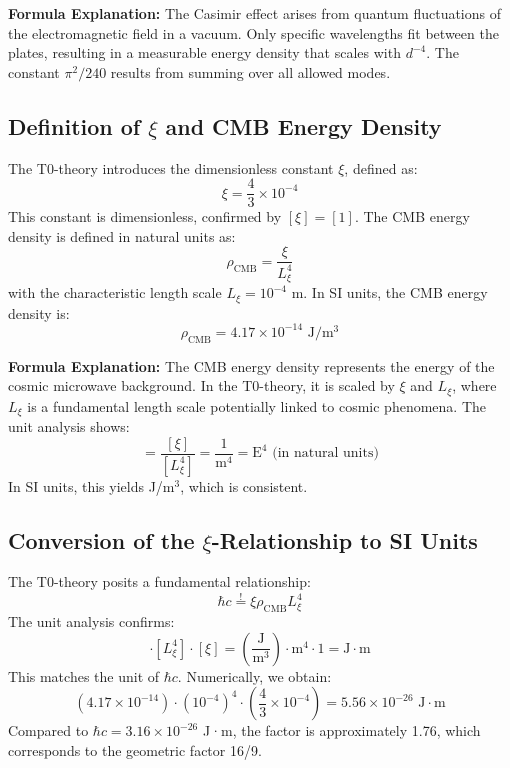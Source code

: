 \documentclass[12pt,a4paper]{article}
\theoremstyle{definition}
\theoremstyle{remark}
\begin{document}
	\textbf{Formula Explanation:} The Casimir effect arises from quantum fluctuations of the electromagnetic field in a vacuum. Only specific wavelengths fit between the plates, resulting in a measurable energy density that scales with $d^{-4}$. The constant $\pi^2/240$ results from summing over all allowed modes.
	
	\subsection{Definition of $\xi$ and CMB Energy Density}
	The T0-theory introduces the dimensionless constant $\xi$, defined as:
	\begin{equation}
		\xi = \frac{4}{3} \times 10^{-4}
	\end{equation}
	This constant is dimensionless, confirmed by $[\xi] = [1]$. The CMB energy density is defined in natural units as:
	\begin{equation}
		\rho_{\text{CMB}} = \frac{\xi}{L_\xi^4}
	\end{equation}
	with the characteristic length scale $L_\xi = 10^{-4}$ m. In SI units, the CMB energy density is:
	\begin{equation}
		\rho_{\text{CMB}} = 4.17 \times 10^{-14} \text{ J}/\text{m}^3
	\end{equation}
	
	\textbf{Formula Explanation:} The CMB energy density represents the energy of the cosmic microwave background. In the T0-theory, it is scaled by $\xi$ and $L_\xi$, where $L_\xi$ is a fundamental length scale potentially linked to cosmic phenomena. The unit analysis shows:
	\begin{equation}
		[\rho_{\text{CMB}}] = \frac{[\xi]}{[L_\xi^4]} = \frac{1}{\text{m}^4} = \text{E}^4 \text{ (in natural units)}
	\end{equation}
	In SI units, this yields J/m$^3$, which is consistent.
	
	\subsection{Conversion of the $\xi$-Relationship to SI Units}
	The T0-theory posits a fundamental relationship:
	\begin{equation}
		\hbar c \stackrel{!}{=} \xi \rho_{\text{CMB}} L_\xi^4
	\end{equation}
	The unit analysis confirms:
	\begin{equation}
		[\rho_{\text{CMB}}] \cdot [L_\xi^4] \cdot [\xi] = \left( \frac{\text{J}}{\text{m}^3} \right) \cdot \text{m}^4 \cdot 1 = \text{J} \cdot \text{m}
	\end{equation}
	This matches the unit of $\hbar c$. Numerically, we obtain:
	\begin{equation}
		\left( 4.17 \times 10^{-14} \right) \cdot \left( 10^{-4} \right)^4 \cdot \left( \frac{4}{3} \times 10^{-4} \right) = 5.56 \times 10^{-26} \text{ J} \cdot \text{m}
	\end{equation}
	Compared to $\hbar c = 3.16 \times 10^{-26}$ J·m, the factor is approximately 1.76, which corresponds to the geometric factor 16/9.
	
\end{document}
